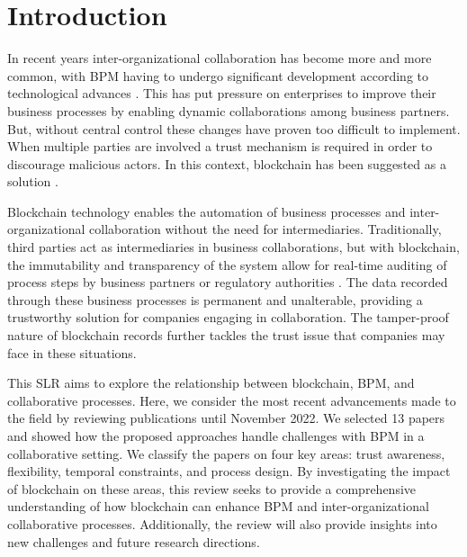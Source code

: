\section{Introduction}
In recent years inter-organizational collaboration has become more and more common, with BPM having to undergo significant development according to technological advances \cite{ARIOUAT2017703}. This has put pressure on enterprises to improve their business processes by enabling dynamic collaborations among business partners. But, without central control these changes have proven too difficult to implement. When multiple parties are involved a trust mechanism is required in order to discourage malicious actors. In this context, blockchain has been suggested as a solution \cite{garcia-garcia_using_2020}.

Blockchain technology enables the automation of business processes and inter-organizational collaboration without the need for intermediaries. Traditionally, third parties act as intermediaries in business collaborations, but with blockchain, the immutability and transparency of the system allow for real-time auditing of process steps by business partners or regulatory authorities \cite{garcia-garcia_using_2020}. The data recorded through these business processes is permanent and unalterable, providing a trustworthy solution for companies engaging in collaboration. The tamper-proof nature of blockchain records further tackles the trust issue that companies may face in these situations.

This SLR aims to explore the relationship between blockchain, BPM, and collaborative processes. Here, we consider the most recent advancements made to the field by reviewing publications until November 2022. We selected 13 papers and showed how the proposed approaches handle challenges with BPM in a collaborative setting. We classify the papers on four key areas: trust awareness, flexibility, temporal constraints, and process design. By investigating the impact of blockchain on these areas, this review seeks to provide a comprehensive understanding of how blockchain can enhance BPM and inter-organizational collaborative processes. Additionally, the review will also provide insights into new challenges and future research directions.


